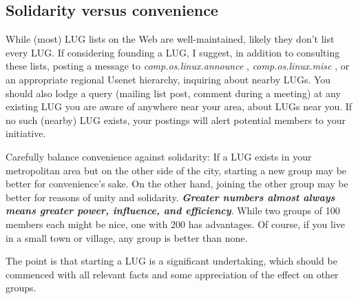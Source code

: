 \subsection{Solidarity versus convenience}

While (most) LUG lists on the Web are well-maintained, likely they don't
list every LUG. If considering founding a LUG, I suggest, in addition to
consulting these lists, posting a message to 
\emph{comp.os.linux.announce} \texttt{\aciurl}
, 
\emph{comp.os.linux.misc} \texttt{\acjurl}
, or an
appropriate regional Usenet hierarchy, inquiring about nearby LUGs. You
should also lodge a query (mailing list post, comment during a meeting)
at any existing LUG you are aware of anywhere near your area,
about LUGs near you.  If no such (nearby) LUG exists, your postings will
alert potential members to your initiative.

Carefully balance convenience against solidarity:  If a LUG exists in
your metropolitan area but on the other side of the city, starting a new
group may be better for convenience's sake. On the other hand, joining
the other group may be better for reasons of unity and solidarity.
{\bfseries {\itshape Greater numbers almost always means greater power, influence,
and efficiency\/}}. While two groups of 100 members each might be
nice, one with 200 has advantages. Of course, if you live in a small
town or village, any group is better than none.

The point is that starting a LUG is a significant undertaking, which
should be commenced with all relevant facts and some appreciation of the
effect on other groups.


